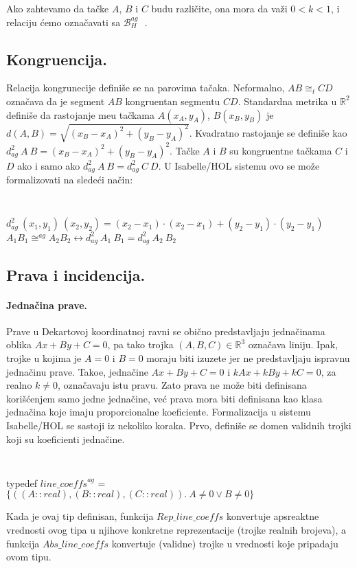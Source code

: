 \documentclass[a4paper, 12pt]{article}
\newcommand{\agbeth}[3]{\ensuremath{\mathcal{B}_H^{\mathit{ag}}\ #1\ #2\ #3}}
\newcommand{\agcongr}[4]{\ensuremath{#1#2 \cong^{ag} #3#4}}
\newcommand{\agsqdist}[2]{\ensuremath{d^2_{ag}\ #1\ #2}}
\newcommand{\congrt}[4]{\ensuremath{#1#2 \cong_t #3#4}}
\begin{document}
\noindent Ako zahtevamo da ta\v cke $A$, $B$ i $C$ budu razli\v cite,
ona mora da va\v zi $0 < k < 1$, i relaciju \'cemo ozna\v cavati sa
$\agbeth{}{}{}$.

\subsection{Kongruencija.} Relacija kongrunecije defini\v se se na parovima
ta\v caka. Neformalno, $\congrt{A}{B}{C}{D}$ ozna\v cava da je segment
$AB$ kongruentan segmentu $CD$. Standardna metrika u $\mathbb{R}^2$
defini\v se da rastojanje me\dj u ta\v ckama $A(x_A, y_A)$, $B(x_B,
y_B)$ je $d(A, B) = \sqrt{(x_B-x_A)^2+(y_B-y_A)^2}$. Kvadratno
rastojanje se defini\v se kao $\agsqdist{A}{B} =
(x_B-x_A)^2+(y_B-y_A)^2$. Ta\v cke $A$ i $B$ su kongruentne ta\v ckama
$C$ i $D$ ako i samo ako $\agsqdist{A}{B} = \agsqdist{C}{D}$. U {\lat
  Isabelle/HOL} sistemu ovo se mo\v ze formalizovati na slede\'ci na\v
cin:

{\tt
\begin{tabbing}
$\agsqdist{(x_1, y_1)}{(x_2, y_2)} = (x_2-x_1)\cdot (x_2-x_1)+(y_2-y_1)\cdot (y_2-y_1)$\\
$\agcongr{A_1}{B_1}{A_2}{B_2} \longleftrightarrow \agsqdist{A_1}{B_1} = \agsqdist{A_2}{B_2}$
\end{tabbing}
}

\subsection{Prava i incidencija.}

\paragraph{Jedna\v cina prave.}
Prave u Dekartovoj koordinatnoj ravni se obi\v cno predstavljaju
jedna\v cinama oblika $Ax + By + C = 0$, pa tako trojka $(A, B, C) \in
\mathbb{R}^3$ ozna\v cava liniju. Ipak, trojke u kojima je $A = 0$ i
$B = 0$ moraju biti izuzete jer ne predstavljaju ispravnu jedna\v cinu
prave. Tako\dj e, jedna\v cine $Ax + By + C = 0$ i $kAx + kBy + kC =
0$, za realno $k \neq 0$, ozna\v cavaju istu pravu. Zato prava ne mo\v
ze biti definisana kori\v s\'cenjem samo jedne jedna\v cine, ve\' c
prava mora biti definisana kao klasa jedna\v cina koje imaju
proporcionalne koeficiente. Formalizacija u sistemu {\lat
  Isabelle/HOL} se sastoji iz nekoliko koraka. Prvo, defini\v se se
domen validnih trojki koji su koeficienti jedna\v cine.
{\tt
\begin{tabbing}
typedef $\mathit{line\_coeffs}^{ag}$ = \\
\hspace{5mm}$\{((A::real), (B::real), (C::real)).\ A \neq 0 \vee B \neq 0\}$
\end{tabbing}
}
\noindent Kada je ovaj tip definisan, funkcija
$\mathit{Rep\_line\_coeffs}$ konvertuje apsreaktne vrednosti ovog tipa
u njihove konkretne reprezentacije (trojke realnih brojeva), a
funkcija $\mathit{Abs\_line\_coeffs}$ konvertuje (validne) trojke u
vrednosti koje pripadaju ovom tipu.
\end{document}
